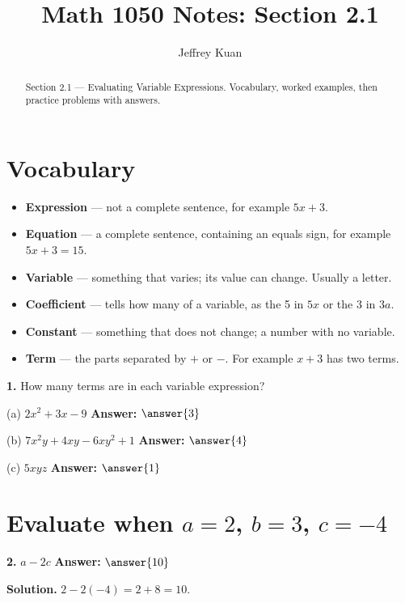 \documentclass{ximera}
\author{Jeffrey Kuan}
\title{Math 1050 Notes: Section 2.1}
\begin{document}
\begin{abstract}
    Section 2.1 --- Evaluating Variable Expressions.
    Vocabulary, worked examples, then practice problems with answers.
\end{abstract}

\maketitle

\section*{Vocabulary}

\begin{itemize}
  \item \textbf{Expression} --- not a complete sentence, for example $5x+3$.
  \item \textbf{Equation} --- a complete sentence, containing an equals sign, for example
        $5x+3=15$.
  \item \textbf{Variable} --- something that varies; its value can change. Usually a
        letter.
  \item \textbf{Coefficient} --- tells how many of a variable, as the 5 in $5x$ or the 3
        in $3a$.
  \item \textbf{Constant} --- something that does not change; a number with no variable.
  \item \textbf{Term} --- the parts separated by $+$ or $-$. For example $x+3$ has two
        terms.
\end{itemize}

\begin{problem}
\textbf{1.} How many terms are in each variable expression?

(a) $2x^{2}+3x-9$ \qquad \textbf{Answer:} $\answer{3}$

(b) $7x^{2}y+4xy-6xy^{2}+1$ \qquad \textbf{Answer:} $\answer{4}$

(c) $5xyz$ \qquad \textbf{Answer:} $\answer{1}$
\end{problem}

\section*{Evaluate when $a=2$, $b=3$, $c=-4$}

\begin{problem}
\textbf{2.} $a-2c$ \qquad \textbf{Answer:} $\answer{10}$

\begin{hint}
\textbf{Solution.} $2-2(-4)=2+8=10$.
\end{hint}
\end{problem}
\end{document}
